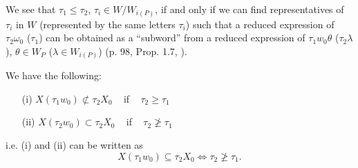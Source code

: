 We see that $\tau_1 \leqslant \tau_2$, $\tau_i \in W / W_{i(P)}$, if and only if we can find representatives of $\tau_i$ in $W$ (represented by the same letters $\tau_i$) such that a reduced expression of $\tau_2 \omega_0 $ (\resp $\tau_1$) can be obtained as a ``subword'' from a reduced expression of $\tau_1 w_0 \theta$  (\resp $\tau_2 \lambda$), $\theta \in W_P$ (\resp $\lambda \in W_{i(P)}$) (\cf p. 98, Prop. 1.7, \cite{art18-key12}).

\begin{lem}\label{art18-lem3}
We have the following:
\begin{itemize}
\item[(i)] $X(\tau_1 w_0) \not\subset \tau_2 X_0$ ~ if ~ $\tau_2 \geqslant \tau_1$

\item[(ii)] $X (\tau_2 w_0) \subset \tau_2 X_0$ ~ if ~ $\tau_2 \not\geqslant \tau_1$
\end{itemize}
i.e. (i) and (ii) can be written as
$$
X(\tau_1 w_0) \subseteq \tau_2 X_0 \Leftrightarrow \tau_2 \not\geqslant \tau_1.
$$
\end{lem}

